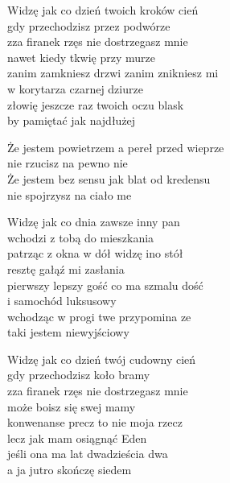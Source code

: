 \begin{text}
    Widzę jak co dzień twoich kroków cień\\
    gdy przechodzisz przez podwórze\\
    zza firanek rzęs nie dostrzegasz mnie\\
    nawet kiedy tkwię przy murze\\
    zanim zamkniesz drzwi zanim znikniesz mi\\
    w korytarza czarnej dziurze\\
    złowię jeszcze raz twoich oczu blask\\
    by pamiętać jak najdłużej

    Że jestem powietrzem a pereł przed wieprze\\
    nie rzucisz na pewno nie\\
    Że jestem bez sensu jak blat od kredensu\\
    nie spojrzysz na ciało me

    Widzę jak co dnia zawsze inny pan\\
    wchodzi z tobą do mieszkania\\
    patrząc z okna w dół widzę ino stół\\
    resztę gałąź mi zasłania\\
    pierwszy lepszy gość co ma szmalu dość\\
    i samochód luksusowy\\
    wchodząc w progi twe przypomina ze\\
    taki jestem niewyjściowy

    Widzę jak co dzień twój cudowny cień\\
    gdy przechodzisz koło bramy\\
    zza firanek rzęs nie dostrzegasz mnie\\
    może boisz się swej mamy\\
    konwenanse precz to nie moja rzecz\\
    lecz jak mam osiągnąć Eden\\
    jeśli ona ma lat dwadzieścia dwa\\
    a ja jutro skończę siedem

\end{text}
